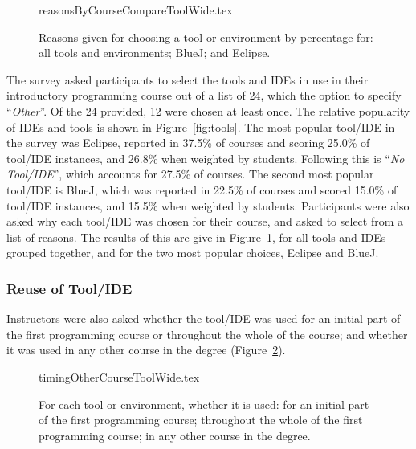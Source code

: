 \documentclass[a4paper,11pt]{article}
\begin{document}
\begin{figure}[ht]
\begin{center}
{reasonsByCourseCompareToolWide.tex}
\end{center}
\caption{Reasons given for choosing a tool or environment by percentage for: all tools and environments; BlueJ; and Eclipse.\label{fig:reasonsTools}}
\end{figure}

The survey asked participants to select the tools and IDEs in use in
their introductory programming course out of a list of 24, which the
option to specify ``{\emph{Other}}''. Of the 24 provided, 12 were
chosen at least once. The relative popularity of IDEs and tools is
shown in Figure~\ref{fig:tools}. The most popular tool/IDE in the
survey was Eclipse, reported in 37.5\% of courses and scoring 25.0\%
of tool/IDE instances, and 26.8\% when weighted by students. Following
this is ``{\emph{No Tool/IDE}}'', which accounts for 27.5\% of
courses. The second most popular tool/IDE is BlueJ, which was reported
in 22.5\% of courses and scored 15.0\% of tool/IDE instances, and
15.5\% when weighted by students. Participants were also asked why
each tool/IDE was chosen for their course, and asked to select from a
list of reasons. The results of this are give in
Figure~\ref{fig:reasonsTools}, for all tools and IDEs grouped
together, and for the two most popular choices, Eclipse and BlueJ.




\subsubsection{Reuse of Tool/IDE}

Instructors were also asked whether the tool/IDE was used for an
initial part of the first programming course or throughout the whole
of the course; and whether it was used in any other course in the
degree (Figure~\ref{fig:toolreuse}). 

\begin{figure}[ht]
\begin{center}
{timingOtherCourseToolWide.tex}
\end{center}
\caption{For each tool or environment, whether it is used: for an initial part of the first programming course; throughout the whole of the first programming course; in any other course in the degree.\label{fig:toolreuse}}
\end{figure}
\end{document}
